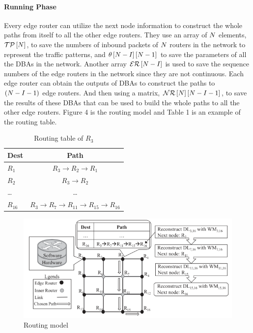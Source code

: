 \documentclass[11pt]{report}
\begin{document}
	\paragraph{Running Phase}
	Every edge router can utilize the next node information to construct the whole paths from itself to all the other edge routers. They use an array of $\mathnormal{N}$ elements, $\mathcal{TP}\left[\mathnormal{N}\right]$, to save the numbers of inbound packets of $\mathnormal{N}$ routers in the network to represent the traffic patterns, and $\theta\left[\mathnormal{N} - \mathnormal{I}\right]\left[\mathnormal{N} - 1\right]$ to save the parameters of all the DBAs in the network. Another array $\mathcal{ER}\left[\mathnormal{N} - \mathnormal{I}\right]$ is used to save the sequence numbers of the edge routers in the network since they are not continuous. Each edge router can obtain the outputs of DBAs to construct the paths to $\left(\mathnormal{N} - \mathnormal{I} - 1\right)$ edge routers. And then using a matrix, $\mathcal{NR}\left[\mathnormal{N}\right]\left[\mathnormal{N} - \mathnormal{I} - 1\right]$, to save the results of these DBAs that can be used to build the whole paths to all the other edge routers. Figure 4 is the routing model and Table 1 is an example of the routing table.\\
	
	

	\begin{table}[!h]
		\centering
		\caption{Routing table of $R_3$}
		\begin{tabular}{lc}
			\toprule
			Dest& Path\\
			\hline
			$R_1$& $R_3 \to R_2 \to R_1$\\
			$R_2$& $R_3 \to R_2$\\
			\dots& \dots\\
			$R_{16}$& $R_3 \to R_7 \to R_{11} \to R_{15} \to R_{16}$\\
			\hline
		\end{tabular}
	\end{table}

	\begin{figure}[h!]
		\centering
		\includegraphics[width=0.5\linewidth]{figure4.png}
		\caption{Routing model}
		\label{fig-label}
	\end{figure}
\end{document}
